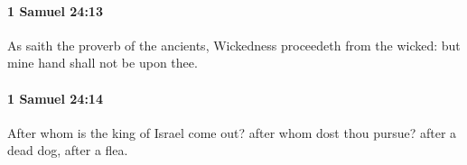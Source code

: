 		\paragraph{1 Samuel 24:13} %
			\label{1SAMUEL-24-13}

			As saith the proverb of the ancients, Wickedness proceedeth from the wicked: but mine hand shall not be upon thee.


		\paragraph{1 Samuel 24:14} %
			\label{1SAMUEL-24-14}

			After whom is the king of Israel come out? after whom dost thou pursue? after a dead dog, after a flea.


